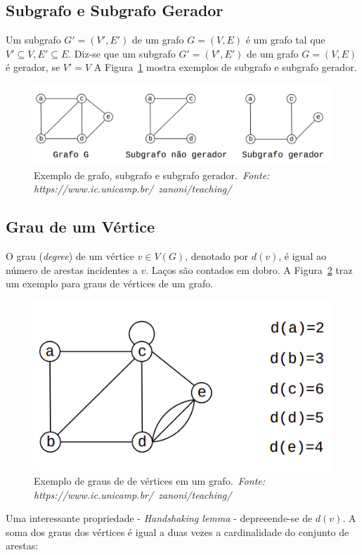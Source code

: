 \documentclass[11pt,fleqn]{book} %
\begin{document}
\subsection{Subgrafo e Subgrafo Gerador}
Um subgrafo $G' = (V', E')$ de um grafo $G = (V,E)$ é um grafo tal que $V' \subseteq V, E' \subseteq E$.
Diz-se que um subgrafo $G' = (V', E')$ de um grafo $G = (V,E)$ é gerador, se $ V' = V$
A Figura~\ref{Grafos03} mostra exemplos de subgrafo e subgrafo gerador.
\begin{figure}[htbp]
	\centering
	\includegraphics[width=.9\textwidth]{Pictures/Grafos03}
	\caption[Exemplo de subgrafo e subgrafo gerador]{Exemplo de grafo, subgrafo e subgrafo gerador.~\textit{Fonte: https://www.ic.unicamp.br/~zanoni/teaching/}}
	\label{Grafos03}
\end{figure}

\subsection{Grau de um Vértice}
O grau (\textit{degree}) de um vértice $v \in V(G)$, denotado por $d(v)$, é igual ao número de arestas incidentes a $v$. 
Laços são contados em dobro. 
A Figura~\ref{Grafos04} traz um exemplo para graus de vértices de um grafo.
\begin{figure}[htbp]
	\centering
	\includegraphics[width=.5\textwidth]{Pictures/Grafos04}
	\caption[Exemplo de graus de de vértices em um grafo.]{Exemplo de graus de de vértices em um grafo.~\textit{Fonte: https://www.ic.unicamp.br/~zanoni/teaching/}}
	\label{Grafos04}
\end{figure}
Uma interessante propriedade - \textit{Handshaking lemma} - depreeende-se de $d(v)$.
A soma dos graus dos vértices é igual a duas vezes a cardinalidade do conjunto de arestas:
\end{document}
